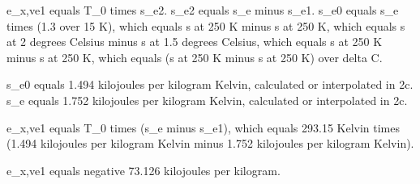 e_x,ve1 equals T_0 times s_e2.
s_e2 equals s_e minus s_e1.
s_e0 equals s_e times (1.3 over 15 K),
which equals s at 250 K minus s at 250 K,
which equals s at 2 degrees Celsius minus s at 1.5 degrees Celsius,
which equals s at 250 K minus s at 250 K,
which equals (s at 250 K minus s at 250 K) over delta C.

s_e0 equals 1.494 kilojoules per kilogram Kelvin, calculated or interpolated in 2c.
s_e equals 1.752 kilojoules per kilogram Kelvin, calculated or interpolated in 2c.

e_x,ve1 equals T_0 times (s_e minus s_e1),
which equals 293.15 Kelvin times (1.494 kilojoules per kilogram Kelvin minus 1.752 kilojoules per kilogram Kelvin).

e_x,ve1 equals negative 73.126 kilojoules per kilogram.